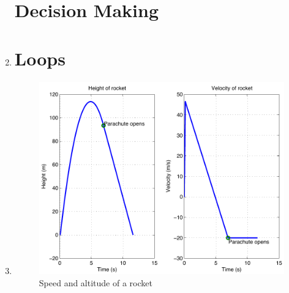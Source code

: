 \begin{enumerate}
\clearpage
\section*{Decision Making}
\item 


\section*{Loops}

\clearpage
\item 
\begin{figure}[h]
	\myfloatalign
	\includegraphics[width=\linewidth]{Graphics/Additional-Ex/rocket-plot}
	\caption{Speed and altitude of a rocket}
	\label{fig:rocket-plot}
\end{figure}

\end{enumerate}
